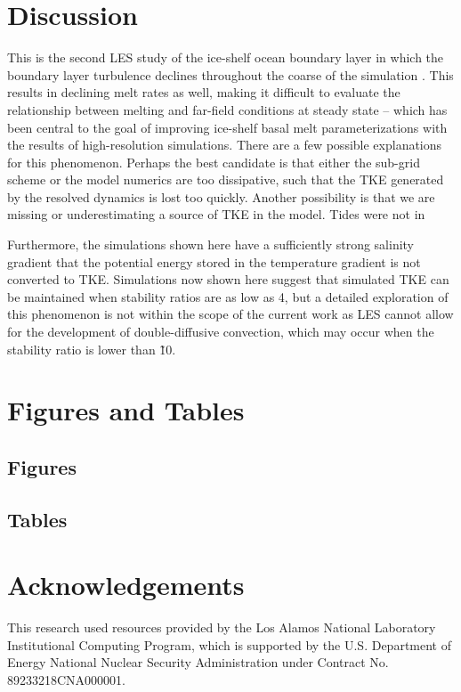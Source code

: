 \documentclass[draft]{styles/agujournal2019}
\begin{document}
\section{Discussion}

This is the second LES study of the ice-shelf ocean boundary layer in which the boundary layer turbulence declines throughout the coarse of the simulation \cite{XX}. This results in declining melt rates as well, making it difficult to evaluate the relationship between melting and far-field conditions at steady state -- which has been central to the goal of improving ice-shelf basal melt parameterizations with the results of high-resolution simulations.
There are a few possible explanations for this phenomenon. Perhaps the best candidate is that either the sub-grid scheme or the model numerics are too dissipative, such that the TKE generated by the resolved dynamics is lost too quickly. Another possibility is that we are missing or underestimating a source of TKE in the model. Tides were not in

Furthermore, the simulations shown here have a sufficiently strong salinity gradient that the potential energy stored in the temperature gradient is not converted to TKE. Simulations now shown here suggest that simulated TKE can be maintained when stability ratios are as low as 4, but a detailed exploration of this phenomenon is not within the scope of the current work as LES cannot allow for the development of double-diffusive convection, which may occur when the stability ratio is lower than \~ 10.  

\section{Figures and Tables}

\subsection{Figures}

\subsection{Tables}


\section{Acknowledgements}

This research used resources provided by the Los Alamos National Laboratory Institutional Computing Program, which is supported by the U.S. Department of Energy National Nuclear Security Administration under Contract No. 89233218CNA000001.
\end{document}
